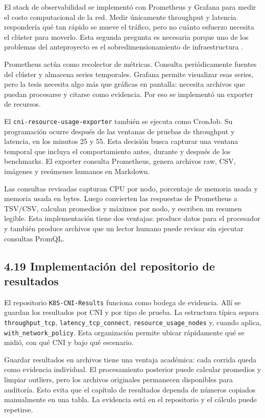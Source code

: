 \documentclass[journal]{IEEEtran}
\begin{document}
El stack de observabilidad se implementó con Prometheus y Grafana para medir el costo computacional de la red. Medir únicamente throughput y latencia respondería qué tan rápido se mueve el tráfico, pero no cuánto esfuerzo necesita el clúster para moverlo. Esta segunda pregunta es necesaria porque uno de los problemas del anteproyecto es el sobredimensionamiento de infraestructura \cite{ref29}.

Prometheus actúa como recolector de métricas. Consulta periódicamente fuentes del clúster y almacena series temporales. Grafana permite visualizar esas series, pero la tesis necesita algo más que gráficas en pantalla: necesita archivos que puedan procesarse y citarse como evidencia. Por eso se implementó un exporter de recursos.

El \texttt{cni-resource-usage-exporter} también se ejecuta como CronJob. Su programación ocurre después de las ventanas de pruebas de throughput y latencia, en los minutos 25 y 55. Esta decisión busca capturar una ventana temporal que incluya el comportamiento antes, durante y después de los benchmarks. El exporter consulta Prometheus, genera archivos raw, CSV, imágenes y resúmenes humanos en Markdown.

Las consultas revisadas capturan CPU por nodo, porcentaje de memoria usada y memoria usada en bytes. Luego convierten las respuestas de Prometheus a TSV/CSV, calculan promedios y máximos por nodo, y escriben un resumen legible. Esta implementación tiene dos ventajas: produce datos para el procesador y también produce archivos que un lector humano puede revisar sin ejecutar consultas PromQL.

\subsection{4.19 Implementación del repositorio de resultados}

El repositorio \texttt{K8S-CNI-Results} funciona como bodega de evidencia. Allí se guardan los resultados por CNI y por tipo de prueba. La estructura típica separa \texttt{throughput\_tcp}, \texttt{latency\_tcp\_connect}, \texttt{resource\_usage\_nodes} y, cuando aplica, \texttt{with\_network\_policy}. Esta organización permite ubicar rápidamente qué se midió, con qué CNI y bajo qué escenario.

Guardar resultados en archivos tiene una ventaja académica: cada corrida queda como evidencia individual. El procesamiento posterior puede calcular promedios y limpiar outliers, pero los archivos originales permanecen disponibles para auditoría. Esto evita que el capítulo de resultados dependa de números copiados manualmente en una tabla. La evidencia está en el repositorio y el cálculo puede repetirse.
\end{document}
